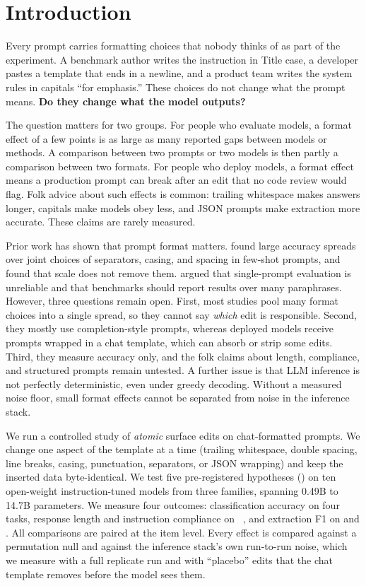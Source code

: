 \section{Introduction}
\label{sec:intro}

Every prompt carries formatting choices that nobody thinks of as part of the experiment. A benchmark author writes the instruction in Title case, a developer pastes a template that ends in a newline, and a product team writes the system rules in capitals ``for emphasis.'' These choices do not change what the prompt means. {\bf Do they change what the model outputs?}

The question matters for two groups. For people who evaluate models, a format effect of a few points is as large as many reported gaps between models or methods. A comparison between two prompts or two models is then partly a comparison between two formats. For people who deploy models, a format effect means a production prompt can break after an edit that no code review would flag. Folk advice about such effects is common: trailing whitespace makes answers longer, capitals make models obey less, and JSON prompts make extraction more accurate. These claims are rarely measured.

Prior work has shown that prompt format matters. \citet{sclar2024quantifying} found large accuracy spreads over joint choices of separators, casing, and spacing in few-shot prompts, and found that scale does not remove them. \citet{mizrahi2024state} argued that single-prompt evaluation is unreliable and that benchmarks should report results over many paraphrases. However, three questions remain open. First, most studies pool many format choices into a single spread, so they cannot say \emph{which} edit is responsible. Second, they mostly use completion-style prompts, whereas deployed models receive prompts wrapped in a chat template, which can absorb or strip some edits. Third, they measure accuracy only, and the folk claims about length, compliance, and structured prompts remain untested. A further issue is that LLM inference is not perfectly deterministic, even under greedy decoding. Without a measured noise floor, small format effects cannot be separated from noise in the inference stack.

We run a controlled study of \emph{atomic} surface edits on chat-formatted prompts. We change one aspect of the template at a time (trailing whitespace, double spacing, line breaks, casing, punctuation, separators, or JSON wrapping) and keep the inserted data byte-identical. We test five pre-registered hypotheses () on ten open-weight instruction-tuned models from three families, spanning 0.49B to 14.7B parameters. We measure four outcomes: classification accuracy on four tasks, response length and instruction compliance on \ifeval~\cite{zhou2023instruction}, and extraction F1 on \squad and \conll. All comparisons are paired at the item level. Every effect is compared against a permutation null and against the inference stack's own run-to-run noise, which we measure with a full replicate run and with ``placebo'' edits that the chat template removes before the model sees them.

